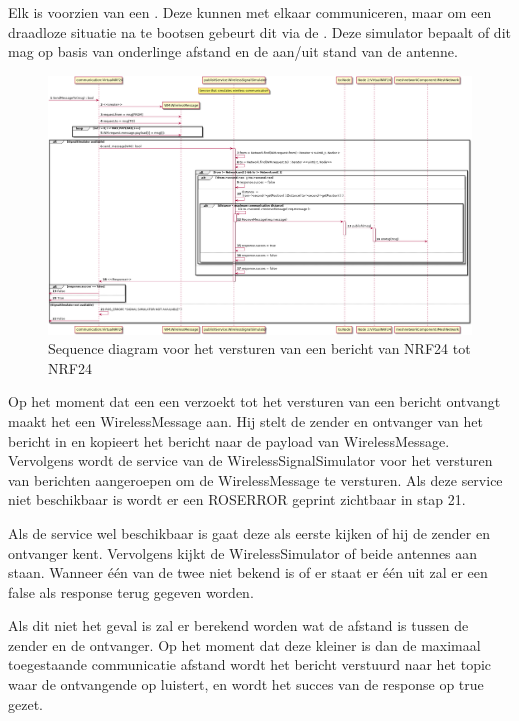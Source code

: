 \documentclass[a4paper, 11pt, oneside]{report}
\begin{document}
Elk  is voorzien van een .
Deze kunnen met elkaar communiceren, maar om een draadloze situatie na te bootsen gebeurt dit via de .
Deze simulator bepaalt of dit mag op basis van onderlinge afstand en de aan/uit stand van de antenne.

\begin{figure}[H]
	\begin{center}\includegraphics[width=\linewidth]{UML/out/ros/sequence/SendMessage/SendMessage.png}\end{center}
	\caption{Sequence diagram voor het versturen van een bericht van NRF24 tot NRF24}
	\label{fig:ros:sequence:sequence:sendmessage}
\end{figure}

Op het moment dat een  een verzoekt tot het versturen van een bericht ontvangt maakt het een WirelessMessage aan.
Hij stelt de zender en ontvanger van het bericht in en kopieert het bericht naar de payload van WirelessMessage.
Vervolgens wordt de service van de WirelessSignalSimulator voor het versturen van berichten aangeroepen om de WirelessMessage te versturen.
Als deze service niet beschikbaar is wordt er een ROS\textunderscore ERROR geprint zichtbaar in stap 21.

Als de service wel beschikbaar is gaat deze als eerste kijken of hij de zender en ontvanger kent.
Vervolgens kijkt de WirelessSimulator of beide antennes aan staan.
Wanneer één van de twee niet bekend is of er staat er één uit zal er een false als response terug gegeven worden.

Als dit niet het geval is zal er berekend worden wat de afstand is tussen de zender en de ontvanger.
Op het moment dat deze kleiner is dan de maximaal toegestaande communicatie afstand wordt het bericht verstuurd naar het topic waar de ontvangende  op luistert, en wordt het succes van de response op true gezet.
\end{document}
